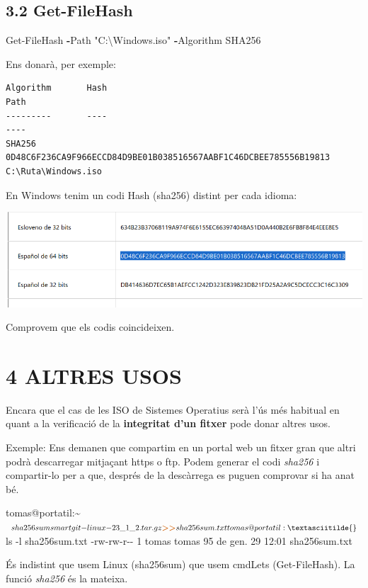\documentclass[
  12 pt,
  a4paper,
]{article}
\newenvironment{Shaded}{\begin{snugshade}}{\end{snugshade}}
\newcommand{\AttributeTok}[1]{\textcolor[rgb]{0.13,0.29,0.53}{#1}}
\newcommand{\ExtensionTok}[1]{#1}
\newcommand{\NormalTok}[1]{#1}
\newcommand{\OperatorTok}[1]{\textcolor[rgb]{0.81,0.36,0.00}{\textbf{#1}}}
\newcommand{\StringTok}[1]{\textcolor[rgb]{0.31,0.60,0.02}{#1}}
\begin{document}
\subsection{3.2 Get-FileHash}\label{get-filehash}

\begin{Shaded}
\begin{Highlighting}[]
\NormalTok{Get{-}FileHash }\OperatorTok{{-}}\NormalTok{Path }\StringTok{"C:\textbackslash{}Windows.iso"} \OperatorTok{{-}}\NormalTok{Algorithm SHA256}
\end{Highlighting}
\end{Shaded}

Ens donarà, per exemple:

\begin{verbatim}
Algorithm       Hash                                                                   Path
---------       ----                                                                   ----
SHA256         0D48C6F236CA9F966ECCD84D9BE01B038516567AABF1C46DCBEE785556B19813       C:\Ruta\Windows.iso
\end{verbatim}

En Windows tenim un codi Hash (sha256) distint per cada idioma:

\includegraphics{png/sha256Windows-3.png}

Comprovem que els codis coincideixen.

\section{4 ALTRES USOS}\label{altres-usos}

Encara que el cas de les ISO de Sistemes Operatius serà l'ús més
habitual en quant a la verificació de la \textbf{integritat d'un fitxer}
pode donar altres usos.

Exemple: Ens demanen que compartim en un portal web un fitxer gran que
altri podrà descarregar mitjaçant https o ftp. Podem generar el codi
\emph{sha256} i compartir-lo per a que, després de la descàrrega es
puguen comprovar si ha anat bé.

\begin{Shaded}
\begin{Highlighting}[]
\ExtensionTok{tomas@portatil:\textasciitilde{}$}\NormalTok{ sha256sum smartgit{-}linux{-}23\_1\_2.tar.gz}\OperatorTok{\textgreater{}\textgreater{}}\NormalTok{sha256sum.txt}
\ExtensionTok{tomas@portatil:\textasciitilde{}$}\NormalTok{ ls }\AttributeTok{{-}l}\NormalTok{ sha256sum.txt}
\ExtensionTok{{-}rw{-}rw{-}r{-}{-}}\NormalTok{ 1 tomas tomas 95 de gen.  29 12:01 sha256sum.txt}
\end{Highlighting}
\end{Shaded}

És indistint que usem Linux (sha256sum) que usem cmdLets (Get-FileHash).
La funció \emph{sha256} és la mateixa.
\end{document}
